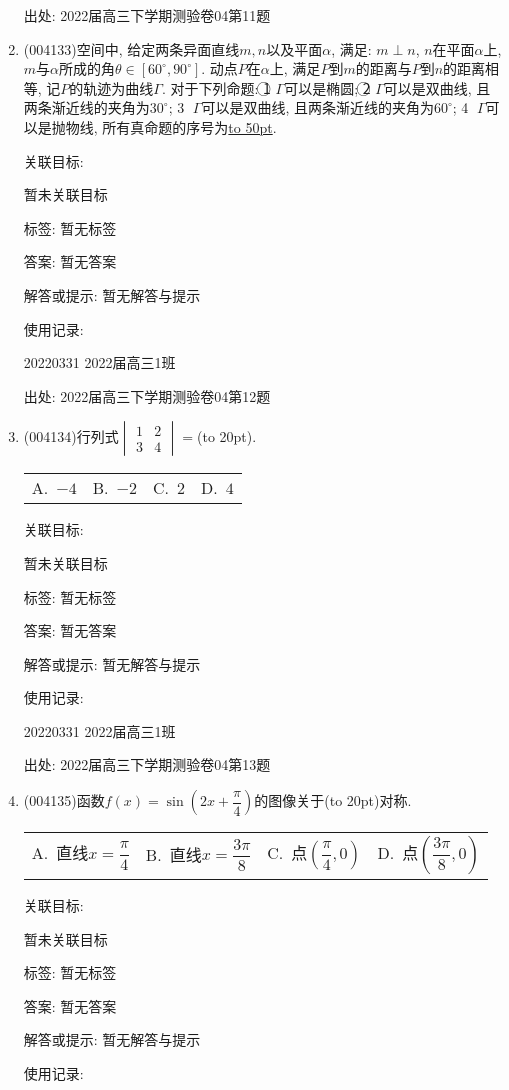 \documentclass[10pt,a4paper]{article}
\newcommand{\blank}[1]{\underline{\hbox to #1pt{}}}
\newcommand{\bracket}[1]{(\hbox to #1pt{})}
\newcommand{\fourch}[4]{\par\begin{tabular}{p{.23\textwidth}p{.23\textwidth}p{.23\textwidth}p{.23\textwidth}}
A.~#1 &B.~#2& C.~#3& D.~#4
\end{tabular}}
\begin{document}
\begin{enumerate}[1.]
出处: 2022届高三下学期测验卷04第11题
\item { (004133)}空间中, 给定两条异面直线$m,n$以及平面$\alpha$, 满足: $m\perp n$, $n$在平面$\alpha$上, $m$与$\alpha$所成的角$\theta\in [60^\circ,90^\circ]$. 动点$P$在$\alpha$上, 满足$P$到$m$的距离与$P$到$n$的距离相等, 记$P$的轨迹为曲线$\Gamma$. 对于下列命题: \textcircled{1} $\Gamma$可以是椭圆; \textcircled{2} $\Gamma$可以是双曲线, 且两条渐近线的夹角为$30^\circ$; \textcircled{3} $\Gamma$可以是双曲线, 且两条渐近线的夹角为$60^\circ$; \textcircled{4} $\Gamma$可以是抛物线, 所有真命题的序号为\blank{50}.


关联目标:

暂未关联目标



标签: 暂无标签

答案: 暂无答案

解答或提示: 暂无解答与提示

使用记录:

20220331	2022届高三1班	


出处: 2022届高三下学期测验卷04第12题
\item { (004134)}行列式$\begin{vmatrix}1 & 2 \\ 3 & 4\end{vmatrix}=$\bracket{20}.
\fourch{$-4$}{$-2$}{$2$}{$4$}


关联目标:

暂未关联目标



标签: 暂无标签

答案: 暂无答案

解答或提示: 暂无解答与提示

使用记录:

20220331	2022届高三1班	


出处: 2022届高三下学期测验卷04第13题
\item { (004135)}函数$f(x)=\sin(2x+\dfrac\pi 4)$的图像关于\bracket{20}对称.
\fourch{直线$x=\dfrac\pi 4$}{直线$x=\dfrac{3\pi}8$}{点$(\dfrac\pi 4,0)$}{点$(\dfrac{3\pi}8,0)$}


关联目标:

暂未关联目标



标签: 暂无标签

答案: 暂无答案

解答或提示: 暂无解答与提示

使用记录:


\end{enumerate}
\end{document}
